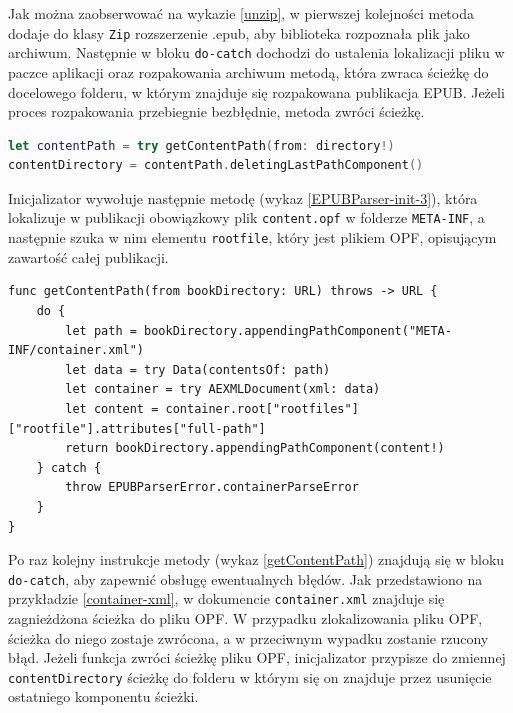 Jak można zaobserwować na wykazie \ref{unzip}, w pierwszej kolejności metoda dodaje do klasy \texttt{Zip} rozszerzenie .epub, aby biblioteka rozpoznała plik jako archiwum. Następnie w bloku \texttt{do-catch} dochodzi do ustalenia lokalizacji pliku w paczce aplikacji oraz rozpakowania archiwum metodą, która zwraca ścieżkę do docelowego folderu, w którym znajduje się rozpakowana publikacja EPUB. Jeżeli proces rozpakowania przebiegnie bezbłędnie, metoda zwróci ścieżkę.

\begin{lstlisting}[firstnumber=12, language=swift, caption={Próba uzyskania ścieżki do pliku \textit{content.opf}},label=EPUBParser-init-3]
let contentPath = try getContentPath(from: directory!)
contentDirectory = contentPath.deletingLastPathComponent()
\end{lstlisting}

Inicjalizator wywołuje następnie metodę (wykaz \ref{EPUBParser-init-3}), która lokalizuje w publikacji obowiązkowy plik \texttt{content.opf} w folderze \texttt{META-INF}, a następnie szuka w nim elementu \texttt{rootfile}, który jest plikiem OPF, opisującym zawartość całej publikacji.

\begin{lstlisting}[caption={Implementacja metody getContentPath(from bookDirectory:)},language=swift-reference,label=getContentPath]
func getContentPath(from bookDirectory: URL) throws -> URL {
    do {
        let path = bookDirectory.appendingPathComponent("META-INF/container.xml")
        let data = try Data(contentsOf: path)
        let container = try AEXMLDocument(xml: data)
        let content = container.root["rootfiles"]["rootfile"].attributes["full-path"]
        return bookDirectory.appendingPathComponent(content!)
    } catch {
        throw EPUBParserError.containerParseError
    }
}
\end{lstlisting}

Po raz kolejny instrukcje metody (wykaz \ref{getContentPath}) znajdują się w bloku \texttt{do-catch}, aby zapewnić obsługę ewentualnych błędów. Jak przedstawiono na przykładzie \ref{container-xml}, w dokumencie \texttt{container.xml} znajduje się zagnieżdżona ścieżka do pliku OPF. W przypadku zlokalizowania pliku OPF, ścieżka do niego zostaje zwrócona, a w przeciwnym wypadku zostanie rzucony błąd. Jeżeli funkcja zwróci ścieżkę pliku OPF, inicjalizator przypisze do zmiennej \texttt{contentDirectory} ścieżkę do folderu w którym się on znajduje przez usunięcie ostatniego komponentu ścieżki.

